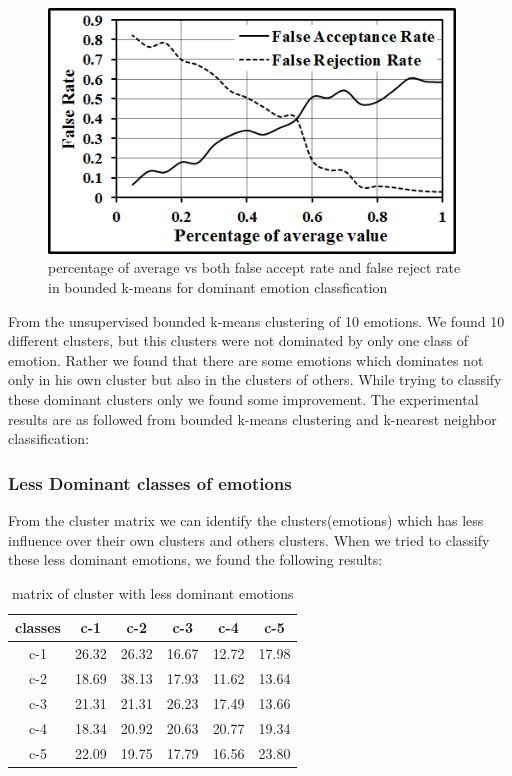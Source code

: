 \begin{figure}
\centering
\includegraphics[width=4.25in,clip,keepaspectratio]{Chapters/figures/Emotion/dominant/fAfR}
\caption{percentage of average vs both false accept rate and false reject rate in bounded k-means for dominant emotion classfication}
\label{Optional 6}
\end{figure}


From the unsupervised bounded k-means clustering of 10 emotions. We found 10 different clusters, but this clusters were not dominated by only one class of emotion. Rather we found that there are some emotions which dominates not only in his own cluster but also in the clusters of others. While trying to classify these dominant clusters only we found some improvement. The experimental results are as followed from bounded k-means clustering and k-nearest neighbor classification:


\clearpage
\subsubsection{Less Dominant classes of emotions}
From the cluster matrix we can identify the clusters(emotions) which has less influence over their own clusters and others clusters. When we tried to classify these less dominant emotions, we found the following results:


\begin{table}

\centering
\begin{tabular}{ |c|c|c|c|c|c| } 
 \hline
 classes & c-1 & c-2 & c-3 & c-4 & c-5\\
\hline
c-1 & 26.32 & 26.32 & 16.67 & 12.72 & 17.98 \\
c-2 & 18.69 & 38.13 & 17.93 & 11.62 & 13.64 \\ 
c-3 & 21.31 & 21.31 & 26.23 & 17.49 & 13.66 \\
c-4  & 18.34 & 20.92 & 20.63 & 20.77 & 19.34 \\
c-5  & 22.09 & 19.75 & 17.79 & 16.56 & 23.80 \\

\hline
\end{tabular}

\caption{matrix of cluster with less dominant emotions}
\label{table:5}
\end{table}


